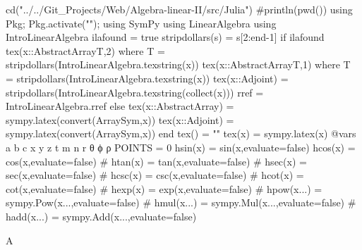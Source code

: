\documentclass{article}
\newcommand\jltex[1]{\jl{tex(#1)}}
\begin{document}
\begin{jlcode}
cd("../../Git_Projects/Web/Algebra-linear-II/src/Julia")
#println(pwd())
using Pkg; Pkg.activate("");
using SymPy
using LinearAlgebra
using IntroLinearAlgebra
ilafound = true
stripdollars(s) = s[2:end-1] 
if ilafound
  tex(x::AbstractArray{T,2}) where T = stripdollars(IntroLinearAlgebra.texstring(x))
  tex(x::AbstractArray{T,1}) where T = stripdollars(IntroLinearAlgebra.texstring(x))
  tex(x::Adjoint) = stripdollars(IntroLinearAlgebra.texstring(collect(x)))
  rref = IntroLinearAlgebra.rref
else
  tex(x::AbstractArray) = sympy.latex(convert(Array{Sym},x))
  tex(x::Adjoint) = sympy.latex(convert(Array{Sym},x))
end
tex() = ""  
tex(x) = sympy.latex(x)
@vars a b c x y z t m n r θ ϕ ρ
POINTS = 0
hsin(x) = sin(x,evaluate=false)
hcos(x) = cos(x,evaluate=false)
#  htan(x) = tan(x,evaluate=false)
#  hsec(x) = sec(x,evaluate=false)
#  hcsc(x) = csc(x,evaluate=false)
#  hcot(x) = cot(x,evaluate=false)
#  hexp(x) = exp(x,evaluate=false)
#  hpow(x...) = sympy.Pow(x...,evaluate=false)
#  hmul(x...) = sympy.Mul(x...,evaluate=false)
#  hadd(x...) = sympy.Add(x...,evaluate=false)
\end{jlcode}
A

\end{document}
